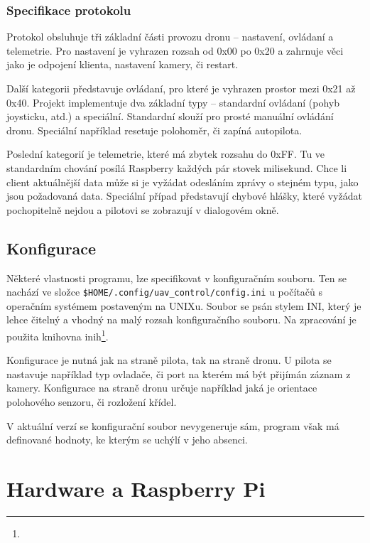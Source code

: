 \documentclass[a4paper,oneside,12pt]{report}
\begin{document}
\subsection{Specifikace protokolu}

Protokol obsluhuje tři základní části provozu dronu -- nastavení, ovládaní a telemetrie.
Pro nastavení je vyhrazen rozsah od 0x00 po 0x20 a zahrnuje věci jako je odpojení klienta, nastavení kamery, či restart.

Další kategorii představuje ovládaní, pro které je vyhrazen prostor mezi 0x21 až 0x40.
Projekt implementuje dva základní typy -- standardní ovládaní (pohyb joysticku, atd.) a speciální.
Standardní slouží pro prosté manuální ovládání dronu.
Speciální například resetuje polohoměr, či zapíná autopilota.

Poslední kategorií je telemetrie, které má zbytek rozsahu do 0xFF.
Tu ve standardním chování posílá Raspberry každých pár stovek milisekund.
Chce li client aktuálnější data může si je vyžádat odesláním zprávy o stejném typu, jako jsou požadovaná data.
Speciální případ představují chybové hlášky, které vyžádat pochopitelně nejdou a pilotovi se zobrazují v dialogovém okně.

\section{Konfigurace}

Některé vlastnosti programu, lze specifikovat v konfiguračním souboru.
Ten se nachází ve složce \verb|$HOME/.config/uav_control/config.ini| u počítačů s operačním systémem postaveným na UNIXu.
Soubor se psán stylem INI, který je lehce čitelný a vhodný na malý rozsah konfiguračního souboru.
Na zpracování je použita knihovna inih\footnote{}.


Konfigurace je nutná jak na straně pilota, tak na straně dronu.
U pilota se nastavuje například typ ovladače, či port na kterém má být přijímán záznam z kamery.
Konfigurace na straně dronu určuje například jaká je orientace polohového senzoru, či rozložení křídel.

V aktuální verzí se konfigurační soubor nevygeneruje sám, program však má definované hodnoty, ke kterým se uchýlí v jeho absenci.





\chapter{Hardware a Raspberry Pi}
\end{document}
